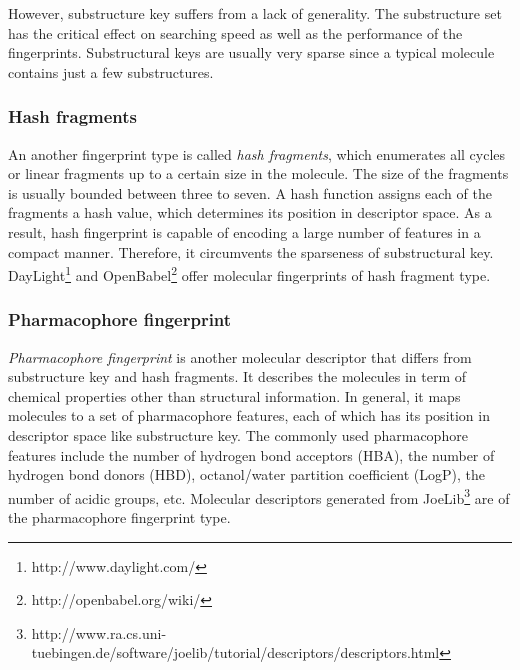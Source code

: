 \documentclass[english]{tktltiki}
\begin{document}
However, substructure key suffers from a lack of generality. The substructure set has the critical effect on searching speed as well as the performance of the fingerprints. Substructural keys are usually very sparse since a typical molecule contains just a few substructures.


\subsubsection{Hash fragments} 

An another fingerprint type is called {\em hash fragments}, which enumerates all cycles or linear fragments up to a certain size in the molecule. The size of the fragments is usually bounded between three to seven. A hash function assigns each of the fragments a hash value, which determines its position in descriptor space. As a result, hash fingerprint is capable of encoding a large number of features in a compact manner. Therefore, it circumvents the sparseness of substructural key. DayLight\footnote{http://www.daylight.com/} and OpenBabel\footnote{http://openbabel.org/wiki/} offer molecular fingerprints of hash fragment type.

\subsubsection{Pharmacophore fingerprint}

{\em Pharmacophore fingerprint} is another molecular descriptor that differs from substructure key and hash fragments. It describes the molecules in term of chemical properties other than structural information. In general, it maps molecules to a set of pharmacophore features, each of which has its position in descriptor space like substructure key. The commonly used pharmacophore features include the number of hydrogen bond acceptors (HBA), the number of hydrogen bond donors (HBD), octanol/water partition coefficient (LogP), the number of acidic groups, etc. Molecular descriptors generated from JoeLib\footnote{http://www.ra.cs.uni-tuebingen.de/software/joelib/tutorial/descriptors/descriptors.html} are of the pharmacophore fingerprint type. 




%
%
\end{document}
